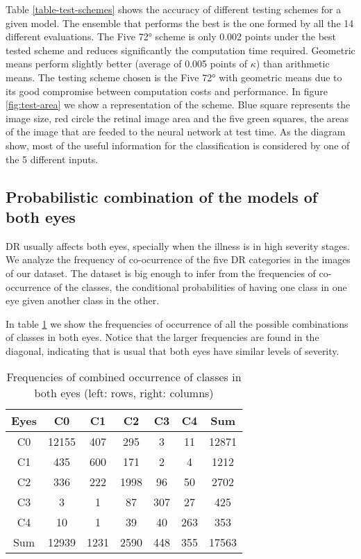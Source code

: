Table \ref{table-test-schemes} shows the accuracy of different testing schemes for a given model. The ensemble that performs the best is the one formed by all the 14 different evaluations. The Five \ang{72} scheme is only 0.002 points under the best tested scheme and reduces significantly the computation time required. Geometric means perform slightly better (average of 0.005 points of $\kappa$) than arithmetic means. The testing scheme chosen is the Five \ang{72} with geometric means due to its good compromise between computation costs and performance. In figure \ref{fig:test-area} we show a representation of the scheme. Blue square represents the image size, red circle the retinal image area and the five green squares, the areas of the image that are feeded to the neural network at test time. As the diagram show, most of the useful information for the classification is considered by one of the 5 different inputs.

\subsection{Probabilistic combination of the models of both eyes}

DR usually affects both eyes, specially when the illness is in high severity stages. We analyze the frequency of co-ocurrence of the five DR categories in the images of our dataset. The dataset is big enough to infer from the frequencies of co-occurrence of the classes, the conditional probabilities of having one class in one eye given another class in the other. 

In table \ref{class:tab:frequencies} we show the frequencies of occurrence of all the possible combinations of classes in both eyes. Notice that the larger frequencies are found in the diagonal, indicating that is usual that both eyes have similar levels of severity.

\begin{table}[ht!]
	\centering
	\begin{tabular}{c c c c c c c} 
		\hline
		Eyes & C0 & C1 & C2 & C3 & C4 & Sum\\ [0.5ex] 
		\hline\hline
		C0 & 12155 & 407 & 295 & 3 & 11 & 12871\\
		C1 & 435 & 600 & 171 & 2 & 4 & 1212\\
		C2 & 336 & 222 & 1998 & 96 & 50 & 2702\\
		C3 & 3 & 1 & 87 & 307 & 27 & 425\\
		C4 & 10 & 1 & 39 & 40 & 263 & 353\\		
		Sum & 12939 & 1231 & 2590 & 448 & 355 & 17563\\
		\hline
	\end{tabular}
	\caption[Frequencies of combined occurrence of classes in both eyes]{Frequencies of combined occurrence of classes in both eyes (left: rows, right: columns)}
	\label{class:tab:frequencies}
\end{table}

